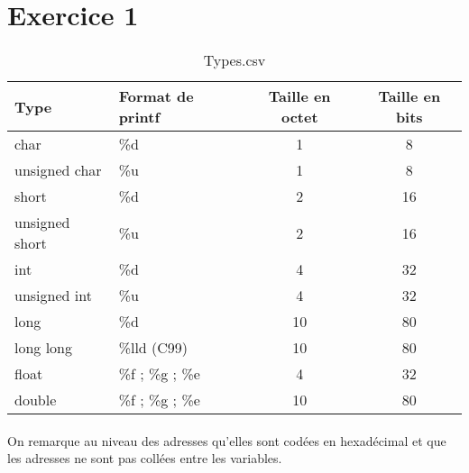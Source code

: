 \documentclass{report}
\begin{document}
\section{Exercice 1}

\begin{table}[h]
	\begin{tabular}{|l|l|c|c|}
		\hline
		\textbf{Type}	&\textbf{Format de printf}	&\textbf{Taille en octet}	&\textbf{Taille en bits}\\
		\hline
		char			&\%d						&1							&8	\\
		\hline
		unsigned char	&\%u						&1							&8	\\
		\hline
		short			&\%d						&2							&16	\\
		\hline
		unsigned short	&\%u						&2							&16	\\
		\hline
		int				&\%d						&4							&32	\\
		\hline
		unsigned int	&\%u						&4							&32	\\
		\hline
		long			&\%d						&10							&80	\\
		\hline
		long long		&\%lld (C99)				&10							&80	\\
		\hline
		float			&\%f ; \%g ; \%e			&4							&32	\\
		\hline
		double			&\%f ; \%g ; \%e			&10							&80 \\
		\hline
	\end{tabular}
	\caption{Types.csv}
	\label{tab:types}
\end{table}

\paragraph{}

On remarque au niveau des adresses qu'elles sont codées en hexadécimal et que
les adresses ne sont pas collées entre les variables.
\end{document}

